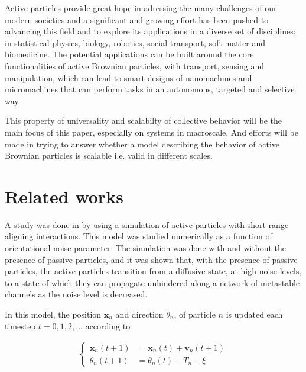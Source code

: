 Active particles provide great hope in adressing the many challenges of our modern societies and 
a significant and growing effort has been pushed to advancing this field and to explore its applications in a 
diverse set of disciplines\cite{bechinger2016active}; 
in statistical physics\cite{ramaswamy2010mechanics}, biology\cite{viswanathan2011physics}, 
robotics\cite{brambilla2013swarm}, social transport\cite{helbing2001traffic}, 
soft matter\cite{marchetti2013hydrodynamics} and biomedicine\cite{wang2012nano}. 
The potential applications can be built around the core functionalities of active 
Brownian particles, with transport, sensing and manipulation, which can lead 
to smart designs of nanomachines and micromachines that can perform tasks in an autonomous, 
targeted and selective way.


This property of universality and scalabilty of collective behavior will be the main focus 
of this paper, especially on systems in macroscale. And efforts will be made in trying to answer 
whether a model describing the behavior of active Brownian particles is scalable i.e. valid 
in different scales.



\section{Related works}
A study was done in \citeyear{nilsson2017metastable} by \citeauthor{nilsson2017metastable} using a simulation of active particles with 
short-range aligning interactions\cite{nilsson2017metastable}. This model was studied numerically as a function of 
orientational noise parameter. The simulation was done with and without the presence of passive particles, 
and it was shown that, with the presence of passive particles, the active particles transition from a diffusive 
state, at high noise levels, to a state of which they can propagate unhindered along a network of metastable channels 
as the noise level is decreased. 

In this model, the position $\bm{x}_n$ and direction $\theta_n$, of particle $n$ 
is updated each timestep $t=0, 1, 2, \ldots$ according to 

\begin{align}
    \begin{cases}
        \bm{x}_n(t+1)       &= \bm{x}_n(t) + \bm{v}_n(t+1) \\
        \theta_n(t+1)       &=  \theta_n(t) + T_n + \xi
    \end{cases}
\end{align}

